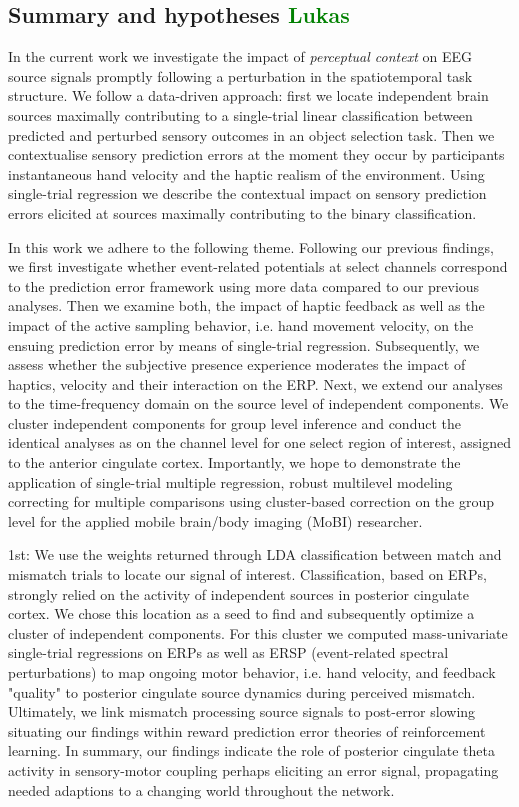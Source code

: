 \subsection{Summary and hypotheses \textcolor{green}{Lukas}}
In the current work we investigate the impact of \textit{perceptual context} on EEG source signals promptly following a perturbation in the spatiotemporal task structure. We follow a data-driven approach: first we locate independent brain sources maximally contributing to a single-trial linear classification between predicted and perturbed sensory outcomes in an object selection task. Then we contextualise sensory prediction errors at the moment they occur by participants instantaneous hand velocity and the haptic realism of the environment. Using single-trial regression we describe the contextual impact on sensory prediction errors elicited at sources maximally contributing to the binary classification.

In this work we adhere to the following theme. Following our previous findings, we first investigate whether event-related potentials at select channels correspond to the prediction error framework using more data compared to our previous analyses. Then we examine both, the impact of haptic feedback as well as the impact of the active sampling behavior, i.e. hand movement velocity, on the ensuing prediction error by means of single-trial regression. Subsequently, we assess whether the subjective presence experience moderates the impact of haptics, velocity and their interaction on the ERP. Next, we extend our analyses to the time-frequency domain on the source level of independent components. We cluster independent components for group level inference and conduct the identical analyses as on the channel level for one select region of interest, assigned to the anterior cingulate cortex. Importantly, we hope to demonstrate the application of single-trial multiple regression, robust multilevel modeling correcting for multiple comparisons using cluster-based correction on the group level for the applied mobile brain/body imaging (MoBI) researcher.

1st: We use the weights returned through LDA classification between match and mismatch trials to locate our signal of interest. Classification, based on ERPs, strongly relied on the activity of independent sources in posterior cingulate cortex. We chose this location as a seed to find and subsequently optimize a cluster of independent components. For this cluster we computed mass-univariate single-trial regressions on ERPs as well as ERSP (event-related spectral perturbations) to map ongoing motor behavior, i.e. hand velocity, and feedback "quality" to posterior cingulate source dynamics during perceived mismatch. Ultimately, we link mismatch processing source signals to post-error slowing situating our findings within reward prediction error theories of reinforcement learning. In summary, our findings indicate the role of posterior cingulate theta activity in sensory-motor coupling perhaps eliciting an error signal, propagating needed adaptions to a changing world throughout the network.

